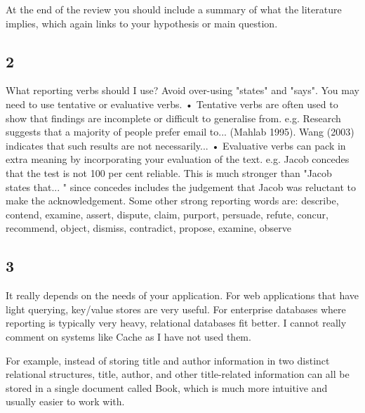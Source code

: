 \documentclass[12pt,letter]{article}
\begin{document}
At the end of the review you should include a summary of what the literature implies, which again links to your hypothesis or main question.

\subsection*{2}
What reporting verbs should I use?
Avoid over-using "states" and "says". You may need to use tentative or evaluative verbs.
• Tentative verbs are often used to show that findings are incomplete or difficult to generalise from.
e.g. Research suggests that a majority of people prefer email to... (Mahlab 1995). Wang (2003) indicates that such results are not necessarily...
• Evaluative verbs can pack in extra meaning by incorporating your evaluation of the text. e.g. Jacob concedes that the test is not 100 per cent reliable.
This is much stronger than "Jacob states that... " since concedes includes the judgement that Jacob was reluctant to make the acknowledgement.
Some other strong reporting words are:
describe, contend, examine, assert, dispute, claim, purport, persuade, refute, concur, recommend, object, dismiss, contradict, propose, examine, observe

\subsection*{3}
It really depends on the needs of your application. For web applications that have light querying, key/value stores are very useful. For enterprise databases where reporting is typically very heavy, relational databases fit better. I cannot really comment on systems like Cache as I have not used them.


For example, instead of storing title and author information in two distinct relational structures, title, author, and other title-related information can all be stored in a single document called Book, which is much more intuitive and usually easier to work with.

\end{document}
